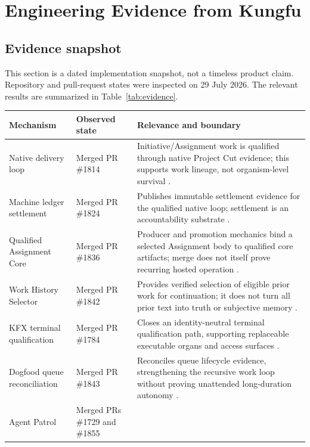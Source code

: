 \section{Engineering Evidence from Kungfu}

\subsection{Evidence snapshot}

This section is a dated implementation snapshot, not a timeless product
claim. Repository and pull-request states were inspected on 29 July 2026.
The relevant results are summarized in Table~\ref{tab:evidence}.

\begin{table}[ht]
\centering
\footnotesize
\begin{tabularx}{\textwidth}{@{}p{}p{}X@{}}
\toprule
\rowcolor{MLIndigo}
\textcolor{MLWhite}{\textbf{Mechanism}} &
\textcolor{MLWhite}{\textbf{Observed state}} &
\textcolor{MLWhite}{\textbf{Relevance and boundary}} \\
\midrule
\rowcolor{MLPanel}
Native delivery loop & Merged PR \#1814 &
Initiative/Assignment work is qualified through native Project Cut evidence;
this supports work lineage, not organism-level survival \cite{kungfu1814}. \\
Machine ledger settlement & Merged PR \#1824 &
Publishes immutable settlement evidence for the qualified native loop;
settlement is an accountability substrate \cite{kungfu1824}. \\
Qualified Assignment Core & Merged PR \#1836 &
Producer and promotion mechanics bind a selected Assignment body to qualified
core artifacts; merge does not itself prove recurring hosted operation
\cite{kungfu1836}. \\
Work History Selector & Merged PR \#1842 &
Provides verified selection of eligible prior work for continuation; it does
not turn all prior text into truth or subjective memory \cite{kungfu1842}. \\
KFX terminal qualification & Merged PR \#1784 &
Closes an identity-neutral terminal qualification path, supporting replaceable
executable organs and access surfaces \cite{kungfu1784}. \\
Dogfood queue reconciliation & Merged PR \#1843 &
Reconciles queue lifecycle evidence, strengthening the recursive work loop
without proving unattended long-duration autonomy \cite{kungfu1843}. \\
Agent Patrol & Merged PRs \#1729 and \#1855 &

\end{tabularx}
\end{table}
